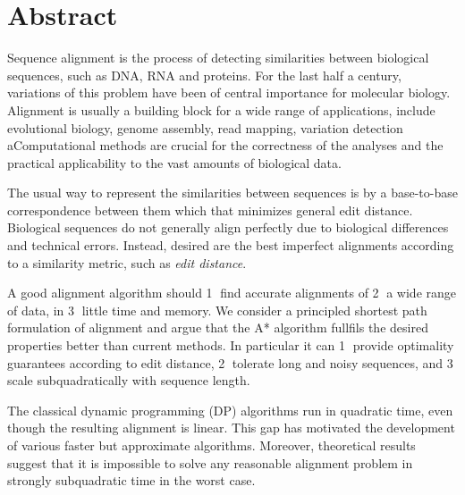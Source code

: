\begingroup
\let\clearpage\relax
\let\cleardoublepage\relax
\let\cleardoublepage\relax

\chapter*{Abstract}

Sequence alignment is the process of detecting similarities between biological
sequences, such as DNA, RNA and proteins. For the last half a century,
variations of this problem have been of central importance for molecular
biology. Alignment is usually a building block for a wide range of applications,
include evolutional biology, genome assembly, read mapping, variation detection
aComputational methods are crucial for the correctness of the analyses and the
practical applicability to the vast amounts of biological data.

The usual way to represent the similarities between sequences is by a
base-to-base correspondence between them which that minimizes general edit
distance. Biological sequences do not generally align perfectly due to
biological differences and technical errors. Instead, desired are the best
imperfect alignments according to a similarity metric, such as \emph{edit
distance}.

A good alignment algorithm should \textcircled{1} find accurate alignments of
\textcircled{2} a wide range of data, in \textcircled{3} little time and memory.
We consider a principled shortest path formulation of alignment and argue that
the A* algorithm fullfils the desired properties better than current methods. In
particular it can \textcircled{1} provide optimality guarantees according to
edit distance, \textcircled{2} tolerate long and noisy sequences, and
\textcircled{3} scale subquadratically with sequence length.


The classical dynamic programming (DP) algorithms run in quadratic time, even
though the resulting alignment is linear. This gap has motivated the development
of various faster but approximate algorithms. Moreover, theoretical results
suggest that it is impossible to solve any reasonable alignment problem in
strongly subquadratic time in the worst case.

